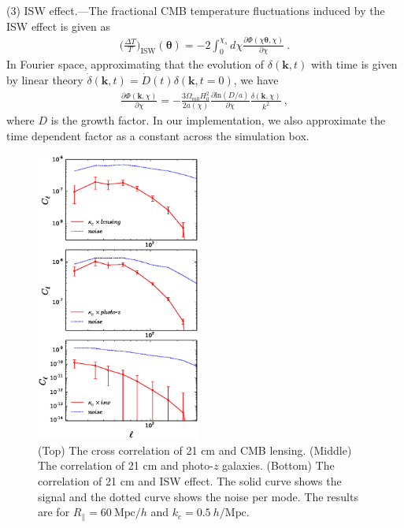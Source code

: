 \documentclass[aps,prl,twocolumn,showpacs,superscriptaddress,groupedaddress,nofootinbib,floatfix]{revtex4}  %
\newcommand{\mr}{\mathrm}
\begin{document}
(3) ISW effect.---The fractional CMB temperature fluctuations induced by the 
ISW effect is given as 
\begin{eqnarray}
\bigg(\frac{\Delta T}{T}\bigg)_\mr{ISW}(\bm\theta)=-2\int_0^{\chi_s}d\chi
\frac{\partial\Phi(\chi\bm{\theta},\chi)}{\partial\chi}\ .
\end{eqnarray}
In Fourier space, approximating that the evolution of $\delta(\bm{k},t)$ with 
time is given by linear theory
$\dot\delta(\bm{k},t)=\dot D(t)\delta(\bm{k},t=0)$, we have
\begin{eqnarray}
\frac{\partial\Phi(\bm{k},\chi)}{\partial\chi}=-\frac{3\Omega_{m0}H_0^2}
{2a(\chi)}\frac{\partial\mr{ln}(D/a)}{\partial\chi}
\frac{\delta(\bm{k},\chi)}{k^2}\ ,
\end{eqnarray}
where $D$ is the growth factor.
In our implementation, we also approximate the time dependent factor as a 
constant across the simulation box.

\begin{figure}[tbp]
\begin{center}
\includegraphics[width=0.48\textwidth]{f8.eps}
\end{center}
\vspace{-1.9cm}
\caption{(Top) The cross correlation of 21 cm and CMB lensing.
(Middle) The correlation of 21 cm and photo-$z$ galaxies. (Bottom) The
correlation of 21 cm and ISW effect. The solid curve shows the signal and the 
dotted curve shows the noise per mode. The results are 
for $R_\parallel=60\ \mr{Mpc}/h$ and $k_c=0.5\ h/\mr{Mpc}$.}
\label{fig:cs}
\end{figure}
\end{document}
